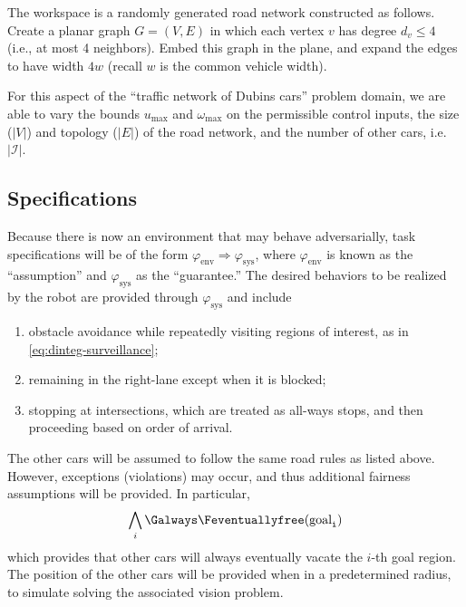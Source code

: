 \documentclass{amsart}
\theoremstyle{definition}
\begin{document}
The workspace is a randomly generated road network constructed as follows.
Create a planar graph $G = (V,E)$ in which each vertex $v$ has degree $d_v \le 4$
(i.e., at most 4 neighbors).  Embed this graph in the plane, and expand the
edges to have width $4w$ (recall $w$ is the common vehicle width).

For this aspect of the ``traffic network of Dubins cars'' problem domain, we are
able to vary the bounds $u_{\mathrm{max}}$ and $\omega_{\mathrm{max}}$ on the
permissible control inputs, the size ($|V|$) and topology ($|E|$) of the road
network, and the number of other cars, i.e. $|\mathcal I|$.


\subsection{Specifications}

Because there is now an environment that may behave adversarially, task
specifications will be of the form $\varphi_{\mathrm{env}} \Rightarrow
\varphi_{\mathrm{sys}}$, where $\varphi_{\mathrm{env}}$ is known as the
``assumption'' and $\varphi_{\mathrm{sys}}$ as the ``guarantee.''  The desired
behaviors to be realized by the robot are provided through
$\varphi_{\mathrm{sys}}$ and include
\begin{enumerate}
\item obstacle avoidance while repeatedly visiting regions of interest, as in
  \eqref{eq:dinteg-surveillance};

\item remaining in the right-lane except when it is blocked;

\item stopping at intersections, which are treated as all-ways stops, and then
  proceeding based on order of arrival.
\end{enumerate}
The other cars will be assumed to follow the same road rules as listed above.
However, exceptions (violations) may occur, and thus additional fairness
assumptions will be provided. In particular,
\begin{equation}\label{eq:freegoals}
\bigwedge_i \Galways \Feventually \tt{free}(\mathrm{goal}_i)
\end{equation}
which provides that other cars will always eventually vacate the $i$-th goal
region. The position of the other cars will be provided when in a predetermined 
radius, to simulate solving the associated vision problem. 

\end{document}
